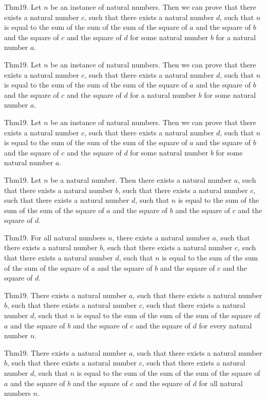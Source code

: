 \documentclass{article}
\begin{document}
Thm19. Let $n$ be an instance of natural numbers. Then we can prove that there exists a natural number $c$, such that there exists a natural number $d$, such that $n$ is equal to the sum of the sum of the sum of the square of $a$ and the square of $b$ and the square of $c$ and the square of $d$ for some natural number $b$ for a natural number $a$.

Thm19. Let $n$ be an instance of natural numbers. Then we can prove that there exists a natural number $c$, such that there exists a natural number $d$, such that $n$ is equal to the sum of the sum of the sum of the square of $a$ and the square of $b$ and the square of $c$ and the square of $d$ for a natural number $b$ for some natural number $a$.

Thm19. Let $n$ be an instance of natural numbers. Then we can prove that there exists a natural number $c$, such that there exists a natural number $d$, such that $n$ is equal to the sum of the sum of the sum of the square of $a$ and the square of $b$ and the square of $c$ and the square of $d$ for some natural number $b$ for some natural number $a$.

Thm19. Let $n$ be a natural number. Then there exists a natural number $a$, such that there exists a natural number $b$, such that there exists a natural number $c$, such that there exists a natural number $d$, such that $n$ is equal to the sum of the sum of the sum of the square of $a$ and the square of $b$ and the square of $c$ and the square of $d$.

Thm19. For all natural numbers $n$, there exists a natural number $a$, such that there exists a natural number $b$, such that there exists a natural number $c$, such that there exists a natural number $d$, such that $n$ is equal to the sum of the sum of the sum of the square of $a$ and the square of $b$ and the square of $c$ and the square of $d$.

Thm19. There exists a natural number $a$, such that there exists a natural number $b$, such that there exists a natural number $c$, such that there exists a natural number $d$, such that $n$ is equal to the sum of the sum of the sum of the square of $a$ and the square of $b$ and the square of $c$ and the square of $d$ for every natural number $n$.

Thm19. There exists a natural number $a$, such that there exists a natural number $b$, such that there exists a natural number $c$, such that there exists a natural number $d$, such that $n$ is equal to the sum of the sum of the sum of the square of $a$ and the square of $b$ and the square of $c$ and the square of $d$ for all natural numbers $n$.
\end{document}
